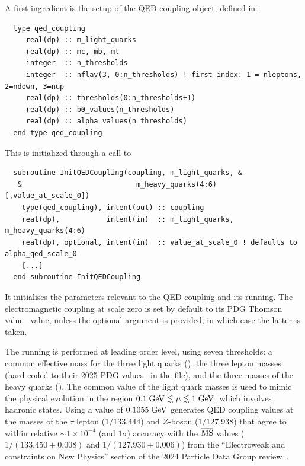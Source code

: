A first ingredient is the setup of the QED coupling object, defined in
:
\begin{lstlisting}
  type qed_coupling 
     real(dp) :: m_light_quarks
     real(dp) :: mc, mb, mt
     integer  :: n_thresholds
     integer  :: nflav(3, 0:n_thresholds) ! first index: 1 = nleptons, 2=ndown, 3=nup
     real(dp) :: thresholds(0:n_thresholds+1)
     real(dp) :: b0_values(n_thresholds)
     real(dp) :: alpha_values(n_thresholds)
  end type qed_coupling
\end{lstlisting}
%
This is initialized through a call to 
\begin{lstlisting}
  subroutine InitQEDCoupling(coupling, m_light_quarks, &
   &                           m_heavy_quarks(4:6) [,value_at_scale_0])
    type(qed_coupling), intent(out) :: coupling
    real(dp),           intent(in)  :: m_light_quarks, m_heavy_quarks(4:6)
    real(dp), optional, intent(in)  :: value_at_scale_0 ! defaults to alpha_qed_scale_0
    [...]
  end subroutine InitQEDCoupling
\end{lstlisting}
%
It initialises the parameters relevant to the QED coupling and its
running.  The electromagnetic coupling at scale zero is set by default
to its PDG Thomson value~\cite{ParticleDataGroup:2022pth} value, unless the optional
argument  is provided, in which case the
latter is taken.

The running is performed at leading order level, using seven
thresholds: a common effective mass for the three light quarks
(), the three lepton masses (hard-coded to their
2025 PDG values~\cite{ParticleDataGroup:2024cfk} in the
 file), and the three masses of the heavy
quarks ().
%
The common value of the light quark masses is used to mimic the
physical evolution in the region $0.1\;\mathrm{GeV} \lesssim \mu \lesssim
1\;\mathrm{GeV}$, which involves hadronic states.
%
Using a value of $0.1055\;\mathrm{GeV}$ generates QED coupling values at the
masses of the $\tau$ lepton ($1/133.444$) and $Z$-boson ($1/127.938$)
that agree to within relative $\sim 1\times 10^{-4}$ (and $1\sigma$) accuracy with the
$\overline{\mathrm{MS}}$ values ($1/(133.450 \pm 0.008)$ and $1/(127.930 \pm 0.006)$)
from the ``Electroweak and constraints on New Physics'' section of the
2024 Particle Data Group review~\cite{ParticleDataGroup:2024cfk}.

